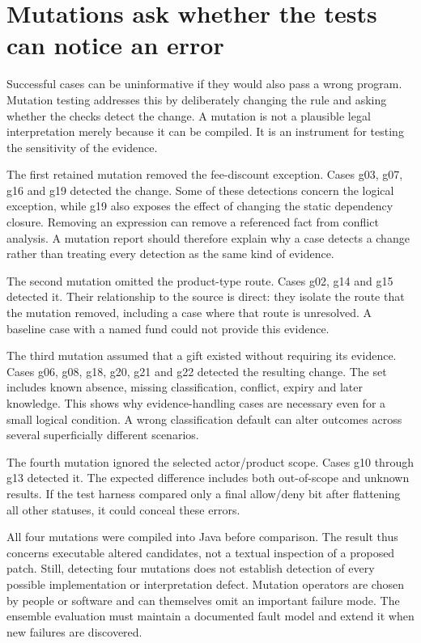 \documentclass[12pt,a4paper,oneside,openany]{book}
\begin{document}
\section{Mutations ask whether the tests can notice an error}
\label{sec:circular-mutations}
Successful cases can be uninformative if they would also pass a wrong program.
Mutation testing addresses this by deliberately changing the rule and asking
whether the checks detect the change. A mutation is not a plausible legal
interpretation merely because it can be compiled. It is an instrument for
testing the sensitivity of the evidence.

The first retained mutation removed the fee-discount exception. Cases g03, g07,
g16 and g19 detected the change. Some of these detections concern the logical
exception, while g19 also exposes the effect of changing the static dependency
closure. Removing an expression can remove a referenced fact from conflict
analysis. A mutation report should therefore explain why a case detects a
change rather than treating every detection as the same kind of evidence.

The second mutation omitted the product-type route. Cases g02, g14 and g15
detected it. Their relationship to the source is direct: they isolate the
route that the mutation removed, including a case where that route is
unresolved. A baseline case with a named fund could not provide this evidence.

The third mutation assumed that a gift existed without requiring its evidence.
Cases g06, g08, g18, g20, g21 and g22 detected the resulting change. The set
includes known absence, missing classification, conflict, expiry and later
knowledge. This shows why evidence-handling cases are necessary even for a
small logical condition. A wrong classification default can alter outcomes
across several superficially different scenarios.

The fourth mutation ignored the selected actor/product scope. Cases g10 through
g13 detected it. The expected difference includes both out-of-scope and unknown
results. If the test harness compared only a final allow/deny bit after
flattening all other statuses, it could conceal these errors.

All four mutations were compiled into Java before comparison. The result thus
concerns executable altered candidates, not a textual inspection of a proposed
patch. Still, detecting four mutations does not establish detection of every
possible implementation or interpretation defect. Mutation operators are chosen
by people or software and can themselves omit an important failure mode. The
ensemble evaluation must maintain a documented fault model and extend it when
new failures are discovered.
\end{document}
